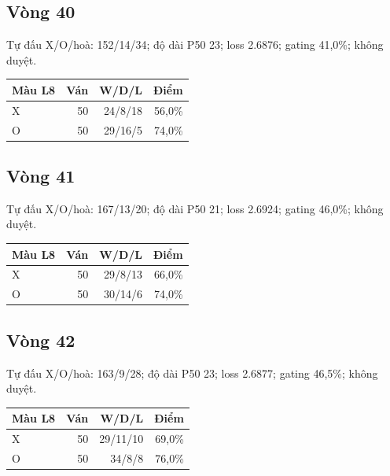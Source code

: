 \subsection*{Vòng 40}

Tự đấu X/O/hoà: 152/14/34; độ dài P50 23; loss 2.6876; gating 41,0\%; không duyệt.

\begin{center}\scriptsize\begin{tabular}{@{}lrrr@{}}\toprule

Màu L8 & Ván & W/D/L & Điểm \\

\midrule

X & 50 & 24/8/18 & 56,0\% \\

O & 50 & 29/16/5 & 74,0\% \\

\bottomrule\end{tabular}\end{center}

\subsection*{Vòng 41}

Tự đấu X/O/hoà: 167/13/20; độ dài P50 21; loss 2.6924; gating 46,0\%; không duyệt.

\begin{center}\scriptsize\begin{tabular}{@{}lrrr@{}}\toprule

Màu L8 & Ván & W/D/L & Điểm \\

\midrule

X & 50 & 29/8/13 & 66,0\% \\

O & 50 & 30/14/6 & 74,0\% \\

\bottomrule\end{tabular}\end{center}

\subsection*{Vòng 42}

Tự đấu X/O/hoà: 163/9/28; độ dài P50 23; loss 2.6877; gating 46,5\%; không duyệt.

\begin{center}\scriptsize\begin{tabular}{@{}lrrr@{}}\toprule

Màu L8 & Ván & W/D/L & Điểm \\

\midrule

X & 50 & 29/11/10 & 69,0\% \\

O & 50 & 34/8/8 & 76,0\% \\

\bottomrule\end{tabular}\end{center}

